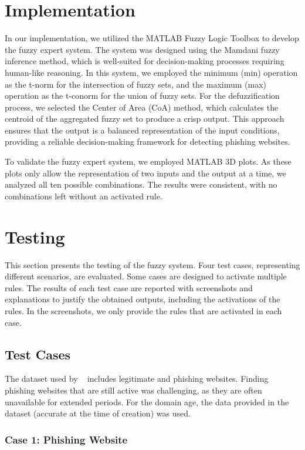\documentclass[11pt]{article}
\begin{document}
\section{Implementation}

In our implementation, we utilized the MATLAB Fuzzy Logic Toolbox to develop the fuzzy expert system. The system was designed using the Mamdani fuzzy inference method, which is well-suited for decision-making processes requiring human-like reasoning. In this system, we employed the minimum (min) operation as the t-norm for the intersection of fuzzy sets, and the maximum (max) operation as the t-conorm for the union of fuzzy sets. For the defuzzification process, we selected the Center of Area (CoA) method, which calculates the centroid of the aggregated fuzzy set to produce a crisp output. This approach ensures that the output is a balanced representation of the input conditions, providing a reliable decision-making framework for detecting phishing websites.

To validate the fuzzy expert system, we employed MATLAB 3D plots. As these plots only allow the representation of two inputs and the output at a time, we analyzed all ten possible combinations. The results were consistent, with no combinations left without an activated rule.


\section{Testing}

This section presents the testing of the fuzzy system. Four test cases, representing different scenarios, are evaluated. Some cases are designed to activate multiple rules. The results of each test case are reported with screenshots and explanations to justify the obtained outputs, including the activations of the rules. In the screenshots, we only provide the rules that are activated in each case.

\subsection{Test Cases}

The dataset used by ~\cite{mainpaper} includes legitimate and phishing websites. Finding phishing websites that are still active was challenging, as they are often unavailable for extended periods. For the domain age, the data provided in the dataset (accurate at the time of creation) was used.

\subsubsection{Case 1: Phishing Website}
\end{document}
